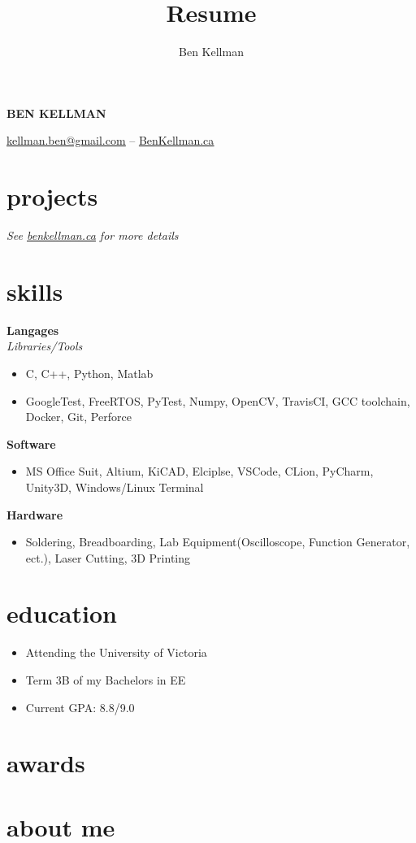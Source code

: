 \documentclass{article}
\author{Ben Kellman}
\title{Resume}
\newcommand{\minicolumns}[2]{
  \begin{minipage}[t]{0.25\textwidth}
    \begin{flushright}
      #1
    \end{flushright}
  \end{minipage}
  \hfill    
  \begin{minipage}[t]{0.7\textwidth}
    #2
  \end{minipage}   
}
\newcommand{\resumeSection}[3]{
  \minicolumns{
      \textbf{#1}\\          
      \textit{#2}
    }
    {  
      \begin{itemize}[leftmargin=*]
          \setlength\itemsep{-0.1em}
          #3
      \end{itemize}
  }
  \vspace{1em}
}
\begin{document}
\begin{center}
  {\bfseries \LARGE \lsstyle \MakeUppercase{Ben Kellman}}
  
  \vspace{0.75em}
  \underline{\href{mailto: kellman.ben@gmail.com}{kellman.ben@gmail.com}} -- \underline{\href{www.BenKellman.ca}{BenKellman.ca}}

\end{center}
\vspace{1em}

\begin{minipage}[t]{0.65\textwidth}
  \section{projects}
  
  
  \textit{See \underline{\href{www.benkellman.ca}{benkellman.ca}} for more details}

  \section{skills}
  \resumeSection{Langages}{Libraries/Tools}{
    \item C, C++, Python, Matlab
    \item GoogleTest, FreeRTOS, PyTest, Numpy, OpenCV, TravisCI, GCC toolchain, Docker, Git, Perforce
  }

  \resumeSection{Software}{}{
    \item MS Office Suit, Altium, KiCAD, Elciplse, VSCode, CLion, PyCharm, Unity3D, Windows/Linux Terminal
    }

  \resumeSection{Hardware}{}{
    \item Soldering, Breadboarding, Lab Equipment(Oscilloscope, Function Generator, ect.), Laser Cutting, 3D Printing
  }
\end{minipage}
\begin{minipage}[t]{0.34\textwidth}
  \section{education}
  \begin{itemize}
    \setlength\itemsep{-0.1em}
    \item Attending the University of Victoria
    \item Term 3B of my Bachelors in EE
    \item Current GPA: 8.8/9.0
  \end{itemize}

  \section{awards}
  \section{about me}
\end{minipage}
\end{document}
